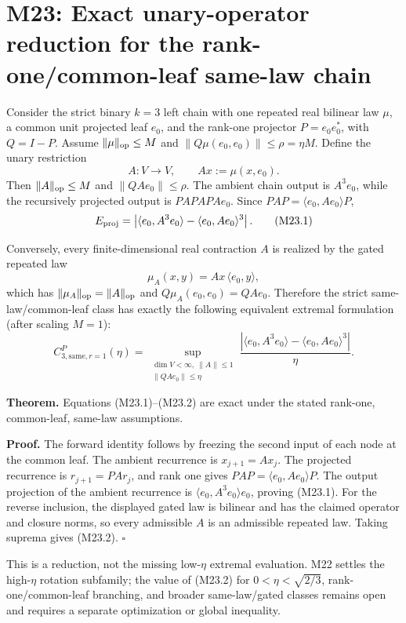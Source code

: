 \section*{M23: Exact unary-operator reduction for the rank-one/common-leaf same-law chain}
\label{sec:m23-rank-one-same-law-reduction}

Consider the strict binary $k=3$ left chain with one repeated real bilinear
law $\mu$, a common unit projected leaf $e_0$, and the rank-one projector
$P=e_0e_0^*$, with $Q=I-P$. Assume $\|\mu\|_{\rm op}\le M$ and
$\|Q\mu(e_0,e_0)\|\le\rho=\eta M$. Define the unary restriction
\[
 A:V\to V,\qquad A x:=\mu(x,e_0).
\]
Then $\|A\|_{\rm op}\le M$ and $\|QAe_0\|\le\rho$. The ambient chain
output is $A^3e_0$, while the recursively projected output is
$PAPAPAe_0$. Since $PAP=\langle e_0,Ae_0\rangle P$,
\[
 E_{\rm proj}
 =\left|\langle e_0,A^3e_0\rangle
 -\langle e_0,Ae_0\rangle^3\right|.
\tag{M23.1}
\]

Conversely, every finite-dimensional real contraction $A$ is realized by the
gated repeated law
\[
 \mu_A(x,y)=A x\,\langle e_0,y\rangle,
\]
which has $\|\mu_A\|_{\rm op}=\|A\|_{\rm op}$ and
 $Q\mu_A(e_0,e_0)=QAe_0$. Therefore the strict same-law/common-leaf class
has exactly the following equivalent extremal formulation (after scaling
$M=1$):
\[
 C_{3,\mathrm{same},r=1}^{P}(\eta)
 =\sup_{\substack{\dim V<\infty,\ \|A\|\le1\\
                         \|QAe_0\|\le\eta}}
 \frac{\left|\langle e_0,A^3e_0\rangle
 -\langle e_0,Ae_0\rangle^3\right|}{\eta}.
\tag{M23.2}
\]

\textbf{Theorem.} Equations (M23.1)--(M23.2) are exact under the stated
rank-one, common-leaf, same-law assumptions.

\textbf{Proof.} The forward identity follows by freezing the second input of
each node at the common leaf. The ambient recurrence is $x_{j+1}=Ax_j$.
The projected recurrence is $r_{j+1}=PA r_j$, and rank one gives
$PAP=\langle e_0,Ae_0\rangle P$. The output projection of the ambient
recurrence is $\langle e_0,A^3e_0\rangle e_0$, proving (M23.1). For the
reverse inclusion, the displayed gated law is bilinear and has the claimed
operator and closure norms, so every admissible $A$ is an admissible repeated
law. Taking suprema gives (M23.2). $\square$

This is a reduction, not the missing low-$\eta$ extremal evaluation. M22
settles the high-$\eta$ rotation subfamily; the value of (M23.2) for
$0<\eta<\sqrt{2/3}$, rank-one/common-leaf branching, and broader
same-law/gated classes remains open and requires a separate optimization or
global inequality.
